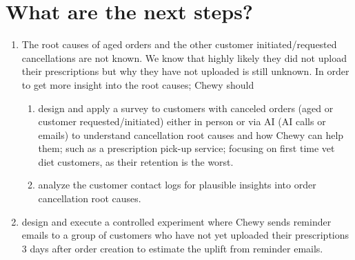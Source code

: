 \section{What are the next steps?}
\begin{enumerate}
\item The root causes of aged orders and the other customer
  initiated/requested cancellations are not known. We know that highly
  likely they did not upload their prescriptions but why they have not
  uploaded is still unknown. In order to get more insight into the
  root causes; Chewy should
\begin{enumerate}
\item design and apply a survey to customers with canceled orders
  (aged or customer requested/initiated) either in person or via AI
  (AI calls or emails) to understand cancellation root causes and how
  Chewy can help them; such as a prescription pick-up service;
  focusing on first time vet diet customers, as their retention is the
  worst.
\item analyze the customer contact logs for plausible insights into
  order cancellation root causes.
\end{enumerate}
\item design and execute a controlled experiment where Chewy sends
  reminder emails to a group of customers who have not yet uploaded their
  prescriptions 3 days after order creation to estimate the uplift
  from reminder emails.
\end{enumerate}

